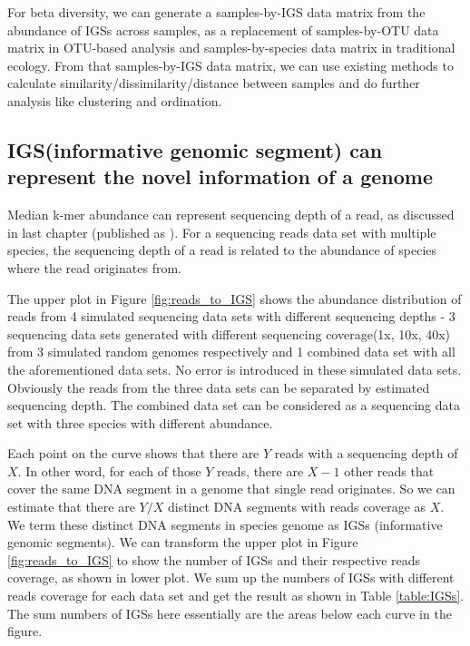 For beta diversity, we can generate a samples-by-IGS data matrix from the
abundance of IGSs across samples, as a replacement of samples-by-OTU data 
matrix in OTU-based analysis and samples-by-species data matrix in traditional 
ecology. From that samples-by-IGS data matrix, we can use existing methods to 
calculate similarity/dissimilarity/distance between samples and do further 
analysis like clustering and ordination. 


\subsection{IGS(informative genomic segment) can represent the novel 
information of a genome}

Median k-mer abundance can represent sequencing depth of a read, as discussed
in last chapter (published as \cite{Brown2012}).
 For a sequencing reads data set with multiple species, the sequencing depth of
 a read is related to the abundance of species where the read originates from. 

The upper plot in Figure \ref{fig:reads_to_IGS} shows the abundance distribution of reads 
from 4 simulated sequencing data sets with different sequencing depths - 3 
sequencing data sets generated with different sequencing coverage(1x, 10x, 40x)
 from 3 simulated random genomes respectively and 1 combined data set with all 
the aforementioned data sets. No error is introduced in these simulated 
data sets. Obviously the reads from the three data sets can be separated by 
estimated sequencing depth. The combined data set can be considered as a 
sequencing data set with three species with different abundance.

Each point on the curve shows that there are $Y$ reads with a sequencing depth of
 $X$. In other word, for each of those $Y$ reads, there are $X-1$ other reads that 
cover the same DNA segment in a genome that single read originates. So we can 
estimate that there are $Y/X$ distinct DNA segments with reads coverage as $X$. 
We term these distinct DNA segments in species genome as 
IGSs (informative genomic segments). We can transform the upper plot in 
Figure \ref{fig:reads_to_IGS} to show the number of IGSs and their respective 
reads coverage, as 
shown in lower plot. We sum up the numbers of IGSs with 
different reads coverage for each data set and get the result as shown in 
Table \ref{table:IGSs}. The sum numbers of IGSs here essentially are the areas below each curve 
in the figure.

